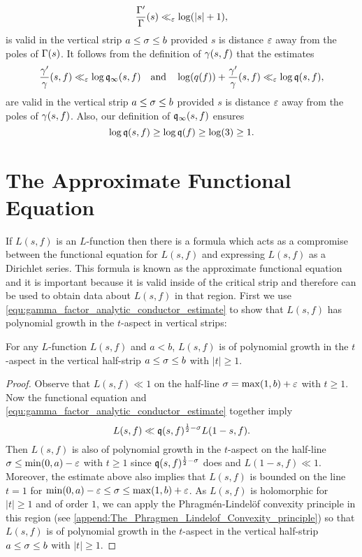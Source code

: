     \[
      \frac{\Gamma'}{\Gamma}(s) \ll_{\varepsilon} \log(|s|+1),
    \]
    is valid in the vertical strip $a \le \sigma \le b$ provided $s$ is distance $\varepsilon$ away from the poles of $\Gamma(s)$. It follows from the definition of $\gamma(s,f)$ that the estimates
    \begin{equation}\label{equ:digamma_gamma_factor_analytic_conductor_estimate}
      \frac{\gamma'}{\gamma}(s,f) \ll_{\varepsilon} \log\mathfrak{q}_{\infty}(s,f) \quad \text{and} \quad \log(q(f))+\frac{\gamma'}{\gamma}(s,f) \ll_{\varepsilon} \log\mathfrak{q}(s,f),
    \end{equation}
    are valid in the vertical strip $a \le \sigma \le b$ provided $s$ is distance $\varepsilon$ away from the poles of $\gamma(s,f)$. Also, our definition of $\mathfrak{q}_{\infty}(s,f)$ ensures
    \[
      \log\mathfrak{q}(s,f) \ge \log\mathfrak{q}(f) \ge \log(3) \ge 1.
    \]
  \section{The Approximate Functional Equation}
    If $L(s,f)$ is an $L$-function then there is a formula which acts as a compromise between the functional equation for $L(s,f)$ and expressing $L(s,f)$ as a Dirichlet series. This formula is known as the approximate functional equation and it is important because it is valid inside of the critical strip and therefore can be used to obtain data about $L(s,f)$ in that region. First we use \cref{equ:gamma_factor_analytic_conductor_estimate} to show that $L(s,f)$ has polynomial growth in the $t$-aspect in vertical strips:

    \begin{proposition}\label{prop:L_function_bounded_in_vertical_strips}
      For any $L$-function $L(s,f)$ and $a < b$, $L(s,f)$ is of polynomial growth in the $t$-aspect in the vertical half-strip $a \le \sigma \le b$ with $|t| \ge 1$.
    \end{proposition}
    \begin{proof}
      Observe that $L(s,f) \ll 1$ on the half-line $\sigma = \max(1,b)+\varepsilon$ with $t \ge 1$. Now the functional equation and \cref{equ:gamma_factor_analytic_conductor_estimate} together imply
      \[
        L(s,f) \ll \mathfrak{q}(s,f)^{\frac{1}{2}-\sigma}L(1-s,f).
      \]
      Then $L(s,f)$ is also of polynomial growth in the $t$-aspect on the half-line $\sigma \le \min(0,a)-\varepsilon$ with $t \ge 1$ since $\mathfrak{q}(s,f)^{\frac{1}{2}-\sigma}$ does and $L(1-s,f) \ll 1$. Moreover, the estimate above also implies that $L(s,f)$ is bounded on the line $t = 1$ for $\min(0,a)-\varepsilon \le \sigma \le \max(1,b)+\varepsilon$. As $L(s,f)$ is holomorphic for $|t| \ge 1$ and of order $1$, we can apply the Phragm\'en-Lindel\"of convexity principle in this region (see \cref{append:The_Phragmen_Lindelof_Convexity_principle}) so that $L(s,f)$ is of polynomial growth in the $t$-aspect in the vertical half-strip $a \le \sigma \le b$ with $|t| \ge 1$.
    \end{proof}

